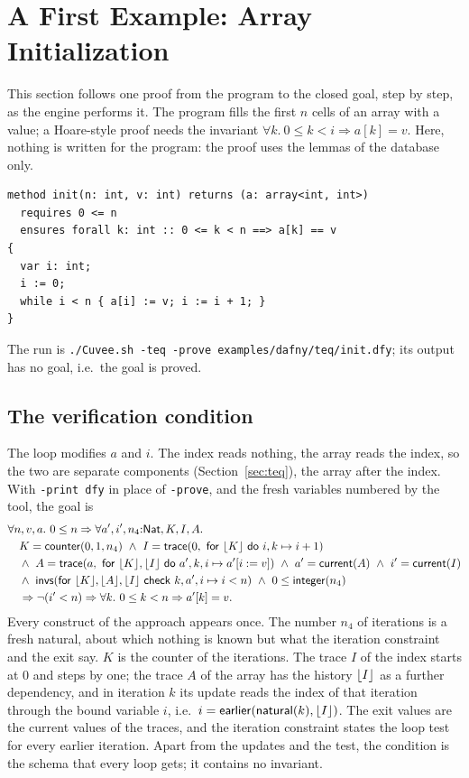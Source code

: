 \section{A First Example: Array Initialization}\label{sec:init}

This section follows one proof from the program to the closed goal, step by step, as the engine performs it. The
program fills the first $n$ cells of an array with a value; a Hoare-style proof needs the invariant
$\forall k.\ 0 \le k < i \Rightarrow a[k] = v$. Here, nothing is written for the program: the proof uses the lemmas
of the database only.
\begin{lstlisting}
method init(n: int, v: int) returns (a: array<int, int>)
  requires 0 <= n
  ensures forall k: int :: 0 <= k < n ==> a[k] == v
{
  var i: int;
  i := 0;
  while i < n { a[i] := v; i := i + 1; }
}
\end{lstlisting}
The run is \texttt{./Cuvee.sh -teq -prove examples/dafny/teq/init.dfy}; its output has no goal, i.e.\ the goal is
proved.

\subsection{The verification condition}
The loop modifies $a$ and $i$. The index reads nothing, the array reads the index, so the two are separate
components (Section~\ref{sec:teq}), the array after the index. With \texttt{-print dfy} in place of
\texttt{-prove}, and the fresh variables numbered by the tool, the goal is
\begin{align*}
&\forall n, v, a.\ 0 \le n \Rightarrow \forall a', i', n_4{:}\mathsf{Nat}, K, I, A.\\
&\quad K = \mathsf{counter}(0, 1, n_4)\ \wedge\ I = \mathsf{trace}(0,\ \mathsf{for}\ \lfloor K\rfloor\ \mathsf{do}\ i, k \mapsto i + 1)\\
&\quad \wedge\ A = \mathsf{trace}(a,\ \mathsf{for}\ \lfloor K\rfloor, \lfloor I\rfloor\ \mathsf{do}\ a', k, i \mapsto a'[i := v])\
 \wedge\ a' = \mathsf{current}(A)\ \wedge\ i' = \mathsf{current}(I)\\
&\quad \wedge\ \mathsf{invs}(\mathsf{for}\ \lfloor K\rfloor, \lfloor A\rfloor, \lfloor I\rfloor\ \mathsf{check}\ k, a', i \mapsto i < n)\ \wedge\ 0 \le \mathsf{integer}(n_4)\\
&\quad \Rightarrow \neg(i' < n) \Rightarrow \forall k.\ 0 \le k < n \Rightarrow a'[k] = v.
\end{align*}
Every construct of the approach appears once. The number $n_4$ of iterations is a fresh natural, about which nothing
is known but what the iteration constraint and the exit say. $K$ is the counter of the iterations. The trace $I$ of
the index starts at $0$ and steps by one; the trace $A$ of the array has the history $\lfloor I\rfloor$ as a further
dependency, and in iteration $k$ its update reads the index of that iteration through the bound variable $i$, i.e.\
$i = \mathsf{earlier}(\mathsf{natural}(k), \lfloor I\rfloor)$. The exit values are the current values of the traces, and the iteration constraint
states the loop test for every earlier iteration. Apart from the updates and the test, the condition is the schema
that every loop gets; it contains no invariant.

